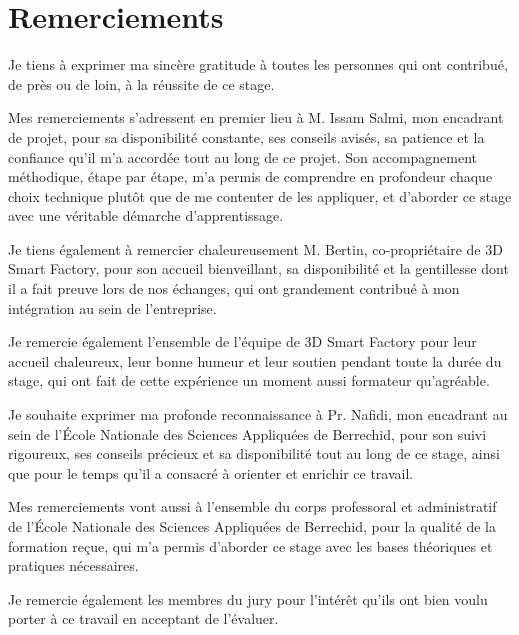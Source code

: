 \documentclass[12pt,a4paper]{report}
\begin{document}
\chapter*{Remerciements}


Je tiens à exprimer ma sincère gratitude à toutes les personnes qui ont
contribué, de près ou de loin, à la réussite de ce stage.

Mes remerciements s'adressent en premier lieu à M. Issam Salmi, mon
encadrant de projet, pour sa disponibilité constante, ses
conseils avisés, sa patience et la confiance qu'il m'a accordée tout au long
de ce projet. Son accompagnement méthodique, étape par étape, m'a permis de
comprendre en profondeur chaque choix technique plutôt que de me contenter
de les appliquer, et d'aborder ce stage avec une véritable démarche
d'apprentissage.

Je tiens également à remercier chaleureusement M. Bertin, co-propriétaire de
3D Smart Factory, pour son accueil bienveillant, sa disponibilité et la
gentillesse dont il a fait preuve lors de nos échanges, qui ont
grandement contribué à mon intégration au sein de l'entreprise.

Je remercie également l'ensemble de l'équipe de 3D Smart Factory pour leur
accueil chaleureux, leur bonne humeur et leur soutien pendant toute la
durée du stage, qui ont fait de cette expérience un moment aussi
formateur qu'agréable.

Je souhaite exprimer ma profonde reconnaissance à Pr. Nafidi, mon
encadrant au sein de l'École Nationale des Sciences Appliquées de Berrechid,
pour son suivi rigoureux, ses conseils précieux et sa disponibilité tout au
long de ce stage, ainsi que pour le temps qu'il a consacré à orienter et
enrichir ce travail.

Mes remerciements vont aussi à l'ensemble du corps professoral et
administratif de l'École Nationale des Sciences Appliquées de Berrechid,
pour la qualité de la formation reçue, qui m'a permis d'aborder ce stage
avec les bases théoriques et pratiques nécessaires.

Je remercie également les membres du jury pour l'intérêt qu'ils ont bien
voulu porter à ce travail en acceptant de l'évaluer.
\end{document}
